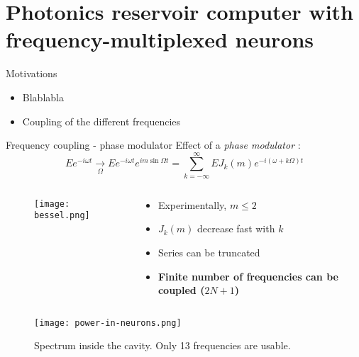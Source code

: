 \section[Photonics RC with frequency-multiplexed neurons]{Photonics reservoir computer with frequency-multiplexed neurons}

\begin{frame}{Motivations}
	\begin{itemize}
		\item Blablabla
		\item Coupling of the different frequencies
	\end{itemize}
\end{frame}

\begin{frame}[allowframebreaks]{Frequency coupling - phase modulator}
	Effect of a \emph{phase modulator} :
	\begin{equation}
		Ee^{-i\omega t} \underset{\Omega}{\rightarrow} Ee^{-i\omega t}e^{im\sin{\Omega t}}= \sum_{k=-\infty}^{\infty} E J_k(m) e^{-i(\omega+k\Omega)t}
	\end{equation}
	
	
	\begin{columns}
	\begin{column}{.5\textwidth}
		\begin{figure}
		\texttt{[image: bessel.png]}
		\end{figure}

	\end{column}
	\begin{column}{.48\textwidth}
			\begin{itemize}
			\item Experimentally, $m \leq 2$
			\item $J_k (m)$ decrease fast with $k$
			\item Series can be truncated
			\item \textbf{Finite number of frequencies can be coupled ($2N+1$)}
		\end{itemize}
	\end{column}%
	\hfill
	\end{columns}
	
	\begin{figure}
		\texttt{[image: power-in-neurons.png]}
		\caption{Spectrum inside the cavity. Only 13 frequencies are usable. \cite{AkroutAkram2016Pprc}}
	\end{figure}
	
\end{frame}

